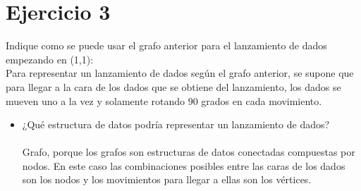 \documentclass{article}
\begin{document}
\section*{Ejercicio 3}
Indique como se puede usar el grafo anterior para el lanzamiento de dados empezando en (1,1):\\

Para representar un lanzamiento de dados según el grafo anterior, se supone que para llegar a la cara de los dados que se obtiene del lanzamiento, los dados se mueven uno a la vez y solamente rotando 90 grados en cada movimiento.

	\begin{itemize}
		\item{¿Qué estructura de datos podría representar un lanzamiento de dados?}\\\\
        Grafo, porque los grafos son estructuras de datos conectadas compuestas por nodos. En este caso las combinaciones posibles entre las caras de los dados son los nodos y los movimientos para llegar a ellas son los vértices.


\end{itemize}
\end{document}
